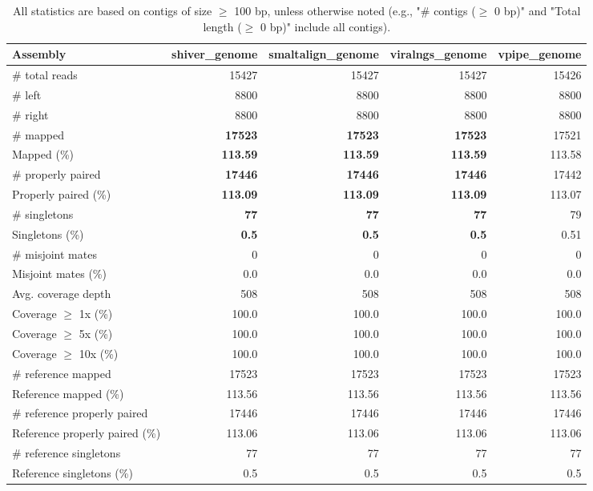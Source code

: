 \documentclass[12pt,a4paper]{article}
\begin{document}
\begin{table}[ht]
\begin{center}
\caption{All statistics are based on contigs of size $\geq$ 100 bp, unless otherwise noted (e.g., "\# contigs ($\geq$ 0 bp)" and "Total length ($\geq$ 0 bp)" include all contigs).}
\begin{tabular}{|l*{4}{|r}|}
\hline
Assembly & shiver\_genome & smaltalign\_genome & viralngs\_genome & vpipe\_genome \\ \hline
\# total reads & 15427 & 15427 & 15427 & 15426 \\ \hline
\# left & 8800 & 8800 & 8800 & 8800 \\ \hline
\# right & 8800 & 8800 & 8800 & 8800 \\ \hline
\# mapped & {\bf 17523} & {\bf 17523} & {\bf 17523} & 17521 \\ \hline
Mapped (\%) & {\bf 113.59} & {\bf 113.59} & {\bf 113.59} & 113.58 \\ \hline
\# properly paired & {\bf 17446} & {\bf 17446} & {\bf 17446} & 17442 \\ \hline
Properly paired (\%) & {\bf 113.09} & {\bf 113.09} & {\bf 113.09} & 113.07 \\ \hline
\# singletons & {\bf 77} & {\bf 77} & {\bf 77} & 79 \\ \hline
Singletons (\%) & {\bf 0.5} & {\bf 0.5} & {\bf 0.5} & 0.51 \\ \hline
\# misjoint mates & 0 & 0 & 0 & 0 \\ \hline
Misjoint mates (\%) & 0.0 & 0.0 & 0.0 & 0.0 \\ \hline
Avg. coverage depth & 508 & 508 & 508 & 508 \\ \hline
Coverage $\geq$ 1x (\%) & 100.0 & 100.0 & 100.0 & 100.0 \\ \hline
Coverage $\geq$ 5x (\%) & 100.0 & 100.0 & 100.0 & 100.0 \\ \hline
Coverage $\geq$ 10x (\%) & 100.0 & 100.0 & 100.0 & 100.0 \\ \hline
\# reference mapped & 17523 & 17523 & 17523 & 17523 \\ \hline
Reference mapped (\%) & 113.56 & 113.56 & 113.56 & 113.56 \\ \hline
\# reference properly paired & 17446 & 17446 & 17446 & 17446 \\ \hline
Reference properly paired (\%) & 113.06 & 113.06 & 113.06 & 113.06 \\ \hline
\# reference singletons & 77 & 77 & 77 & 77 \\ \hline
Reference singletons (\%) & 0.5 & 0.5 & 0.5 & 0.5 \\ \hline

\end{tabular}
\end{center}
\end{table}
\end{document}
